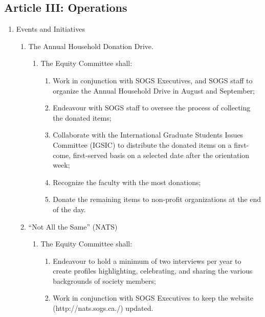 \subsection{Article III: Operations}
\begin{enumerate}[label*=\arabic*., align=left]	
\item Events and Initiatives
\begin{enumerate}[label*=\arabic*., align=left]	
\item The Annual Household Donation Drive.
\begin{enumerate}[label*=\arabic*., align=left]
\item The Equity Committee shall:
\begin{enumerate}[label*=\arabic*., align=left]
\item Work in conjunction with SOGS Executives, and SOGS                 staff to organize the Annual Household Drive in August and                 September;
\item Endeavour with SOGS staff to oversee the process of                 collecting the donated items;
\item Collaborate with the International Graduate Students                 Issues Committee (IGSIC) to distribute the donated items on a first-come, first-served basis on a selected date after the orientation week;
\item Recognize the faculty with the most donations;
\item Donate the remaining items to non-profit organizations at the end of the day.
\end{enumerate}
\end{enumerate}
\item “Not All the Same” (NATS)
\begin{enumerate}[label*=\arabic*., align=left]
\item The Equity Committee shall:
\begin{enumerate}[label*=\arabic*., align=left]
\item Endeavour to hold a minimum of two interviews per year to create profiles highlighting, celebrating, and sharing the various backgrounds of society members;
\item Work in conjunction with SOGS Executives to keep the          website (http://nats.sogs.ca./) updated.
\end{enumerate}
\end{enumerate}
\end{enumerate}
\end{enumerate}